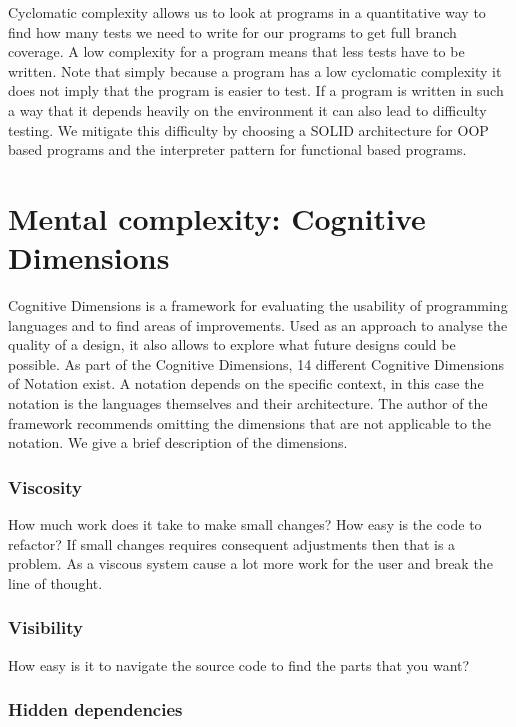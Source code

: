 \documentclass[12pt]{report}
\theoremstyle{definition}
\theoremstyle{theorem}
\begin{document}
Cyclomatic complexity allows us to look at programs in a quantitative way to
find how many tests we need to write for our programs to get full branch
coverage. A low complexity for a program means that less tests have to be
written.  Note that simply because a program has a low cyclomatic complexity it
does not imply that the program is easier to test. If a program is written in
such a way that it depends heavily on the environment it can also lead to
difficulty testing. We mitigate this difficulty by choosing a SOLID architecture
for OOP based programs and the interpreter pattern for functional based
programs.

\section{Mental complexity: Cognitive Dimensions}\label{cognitivedimensions}

Cognitive Dimensions is a framework for evaluating the usability of programming
languages and to find areas of improvements. Used as an approach to analyse the
quality of a design, it also allows to explore what future designs could be
possible. As part of the Cognitive Dimensions, 14 different Cognitive Dimensions
of Notation exist. A notation depends on the specific context, in this case the
notation is the languages themselves and their architecture. The author of the
framework recommends omitting the dimensions that are not applicable to the
notation. We give a brief description of the dimensions.

\subsubsection*{Viscosity}

How much work does it take to make small changes? How easy is the code to
refactor? If small changes requires consequent adjustments then that is a
problem. As a viscous system cause a lot more work for the user and break the
line of thought.

\subsubsection*{Visibility}

How easy is it to navigate the source code to find the parts that you want?

\subsubsection*{Hidden dependencies}
\end{document}
